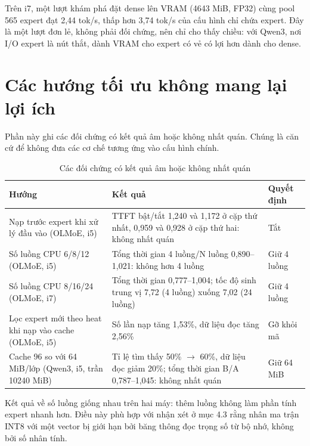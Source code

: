 Trên i7, một lượt khám phá đặt dense lên VRAM (4643 MiB, FP32) cùng pool 565 expert đạt 2,44 tok/s, thấp hơn 3,74 tok/s của cấu hình chỉ chứa expert. Đây là một lượt đơn lẻ, không phải đối chứng, nên chỉ cho thấy chiều: với Qwen3, nơi I/O expert là nút thắt, dành VRAM cho expert có vẻ có lợi hơn dành cho dense.

\section{Các hướng tối ưu không mang lại lợi ích}

Phần này ghi các đối chứng có kết quả âm hoặc không nhất quán. Chúng là căn cứ để không đưa các cơ chế tương ứng vào cấu hình chính.

\begin{table}[htbp]
\centering
\caption{Các đối chứng có kết quả âm hoặc không nhất quán}
\label{tab:negative}
\small
\setlength{\tabcolsep}{3pt}
\begin{tabularx}{\textwidth}{>{\RaggedRight\arraybackslash}p{3.4cm} >{\RaggedRight\arraybackslash}X >{\RaggedRight\arraybackslash}p{2.6cm}}
\toprule
\textbf{Hướng} & \textbf{Kết quả} & \textbf{Quyết định} \\
\midrule
Nạp trước expert khi xử lý đầu vào (OLMoE, i5) & TTFT bật/tắt 1,240 và 1,172 ở cặp thứ nhất, 0,959 và 0,928 ở cặp thứ hai: không nhất quán & Tắt \\
Số luồng CPU 6/8/12 (OLMoE, i5) & Tổng thời gian 4 luồng/N luồng 0,890--1,021: không hơn 4 luồng & Giữ 4 luồng \\
Số luồng CPU 8/16/24 (OLMoE, i7) & Tổng thời gian 0,777--1,004; tốc độ sinh trung vị 7,72 (4 luồng) xuống 7,02 (24 luồng) & Giữ 4 luồng \\
Lọc expert mới theo heat khi nạp vào cache (OLMoE, i5) & Số lần nạp tăng 1,53\%, dữ liệu đọc tăng 2,56\% & Gỡ khỏi mã \\
Cache 96 so với 64 MiB/lớp (Qwen3, i5, trần 10240 MiB) & Tỉ lệ tìm thấy 50\% $\rightarrow$ 60\%, dữ liệu đọc giảm 20\%; tổng thời gian B/A 0,787--1,045: không nhất quán & Giữ 64 MiB \\
\bottomrule
\end{tabularx}
\par{}
\end{table}

Kết quả về số luồng giống nhau trên hai máy: thêm luồng không làm phần tính expert nhanh hơn. Điều này phù hợp với nhận xét ở mục 4.3 rằng nhân ma trận INT8 với một vector bị giới hạn bởi băng thông đọc trọng số từ bộ nhớ, không bởi số nhân tính.

